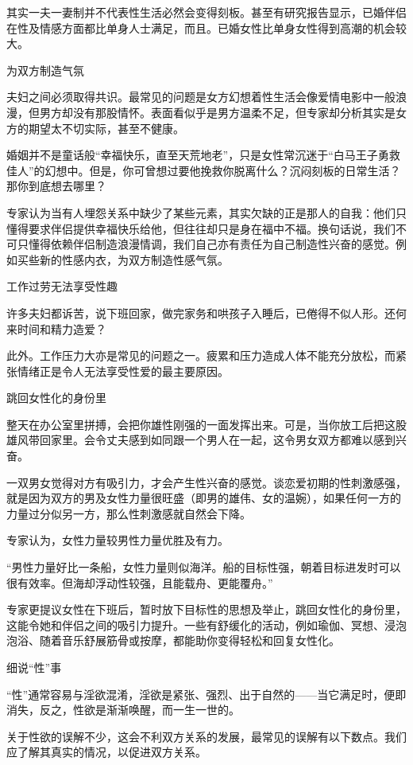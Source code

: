 \documentclass[12pt,UTF8,openany]{ctexbook}
\begin{document}
其实一夫一妻制并不代表性生活必然会变得刻板。甚至有研究报告显示，已婚伴侣在性及情感方面都比单身人士满足，而且。已婚女性比单身女性得到高潮的机会较大。

为双方制造气氛

夫妇之间必须取得共识。最常见的问题是女方幻想着性生活会像爱情电影中一般浪漫，但男方却没有那股情怀。表面看似乎是男方温柔不足，但专家却分析其实是女方的期望太不切实际，甚至不健康。

婚姻并不是童话般“幸福快乐，直至天荒地老”，只是女性常沉迷于“白马王子勇救佳人”的幻想中。但是，你可曾想过要他挽救你脱离什么？沉闷刻板的日常生活？那你到底想去哪里？

专家认为当有人埋怨关系中缺少了某些元素，其实欠缺的正是那人的自我：他们只懂得要求伴侣提供幸福快乐给他，但往往却只是身在福中不福。换句话说，我们不可只懂得依赖伴侣制造浪漫情调，我们自己亦有责任为自己制造性兴奋的感觉。例如买些新的性感内衣，为双方制造性感气氛。

工作过劳无法享受性趣

许多夫妇都诉苦，说下班回家，做完家务和哄孩子入睡后，已倦得不似人形。还何来时间和精力造爱？

此外。工作压力大亦是常见的问题之一。疲累和压力造成人体不能充分放松，而紧张情绪正是令人无法享受性爱的最主要原因。

跳回女性化的身份里

整天在办公室里拼搏，会把你雄性刚强的一面发挥出来。可是，当你放工后把这股雄风带回家里。会令丈夫感到如同跟一个男人在一起，这令男女双方都难以感到兴奋。

一双男女觉得对方有吸引力，才会产生性兴奋的感觉。谈恋爱初期的性刺激感强，就是因为双方的男及女性力量很旺盛（即男的雄伟、女的温婉），如果任何一方的力量过分似另一方，那么性刺激感就自然会下降。

专家认为，女性力量较男性力量优胜及有力。

“男性力量好比一条船，女性力量则似海洋。船的目标性强，朝着目标进发时可以很有效率。但海却浮动性较强，且能载舟、更能覆舟。”

专家更提议女性在下班后，暂时放下目标性的思想及举止，跳回女性化的身份里，这能令她和伴侣之间的吸引力提升。一些有舒缓化的活动，例如瑜伽、冥想、浸泡泡浴、随着音乐舒展筋骨或按摩，都能助你变得轻松和回复女性化。





细说“性”事


“性”通常容易与淫欲混淆，淫欲是紧张、强烈、出于自然的——当它满足时，便即消失，反之，性欲是渐渐唤醒，而一生一世的。

关于性欲的误解不少，这会不利双方关系的发展，最常见的误解有以下数点。我们应了解其真实的情况，以促进双方关系。
\end{document}
